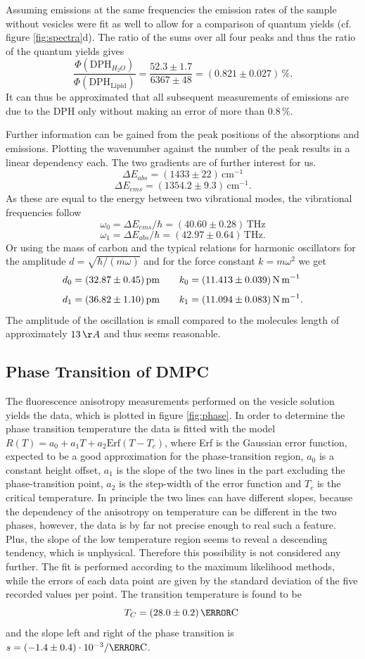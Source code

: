 \documentclass{scrartcl}
\numberwithin{equation}{section}
\numberwithin{figure}{section}
\numberwithin{table}{section}
\newcommand{\eq}[2]{\begin{equation}#1\label{#2}\end{equation}}
\begin{document}
Assuming emissions at the same frequencies the emission rates of the sample without vesicles were fit as well to allow for a comparison of quantum yields (cf. figure \ref{fig:spectra}d). The ratio of the sums over all four peaks and thus the ratio of the quantum yields gives
\eq{\frac{\Phi(\text{DPH}_{H_2 O})}{\Phi(\text{DPH}_{\text{Lipid}})} = \frac{52.3\pm 1.7}{6367\pm 48} = (0.821\pm 0.027)\,\% . }{}
It can thus be approximated that all subsequent measurements of emissions are due to the DPH only without making an error of more than $0.8\,\%$.

Further information can be gained from the peak positions of the absorptions and emissions. Plotting the wavenumber against the number of the peak results in a linear dependency each. The two gradients are of further interest for us.
\eq{ \Delta E_{abs} = (1433\pm 22)\,\text{cm}^{-1} }{}
\eq{ \Delta E_{ems} = (1354.2\pm 9.3)\,\text{cm}^{-1} . }{}
As these are equal to the energy between two vibrational modes, the vibrational frequencies follow
\eq{ \omega_0 = \Delta E_{ems} / \hbar = (40.60\pm 0.28)\,\text{THz} }{}
\eq{ \omega_1 = \Delta E_{abs} / \hbar = (42.97\pm 0.64)\,\text{THz} . }{}
Or using the mass of carbon and the typical relations for harmonic oscillators for the amplitude $d=\sqrt{\hbar / (m\omega)}$ and for the force constant $k=m\omega^2$ we get
\eq{ d_0 = (32.87\pm  0.45)\,\text{pm} \qquad k_0 = (11.413\pm 0.039)\,\text{N\,m}^{-1}\;}{}
\eq{ d_1 = (36.82\pm  1.10)\,\text{pm} \qquad k_1 = (11.094\pm 0.083)\,\text{N\,m}^{-1} .}{}
The amplitude of the oscillation is small compared to the molecules length of approximately $13\,\AA$ and thus seems reasonable.

\clearpage

\subsection{Phase Transition of DMPC}
The fluorescence anisotropy measurements performed on the vesicle solution yields the data, which is plotted in figure \ref{fig:phase}. In order to determine the phase transition temperature the data is fitted with the model $R(T) = a_0 + a_1 T + a_2 \text{Erf}(T - T_c)$, where Erf is the Gaussian error function, expected to be a good approximation for the phase-transition region, $a_0$ is a constant height offset, $a_1$ is the slope of the two lines in the part excluding the phase-transition point, $a_2$ is the step-width of the error function and $T_c$ is the critical temperature. In principle the two lines can have different slopes, because the dependency of the anisotropy on temperature can be different in the two phases, however, the data is by far not precise enough to real such a feature. Plus, the slope of the low temperature region seems to reveal a descending tendency, which is unphysical. Therefore this possibility is not considered any further. The fit is performed according to the maximum likelihood methods, while the errors of each data point are given by the standard deviation of the five recorded values per point. The transition temperature is found to be
\eq{ T_C = ( 28.0 \pm 0.2 ) \, \degree \text{C} \; }{Tc}
and the slope left and right of the phase transition is $s = (-1.4 \pm 0.4 ) \cdot 10^{-3} / \degree \text{C}$. 
\end{document}
